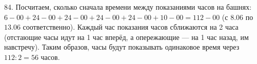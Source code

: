 84. Посчитаем, сколько сначала времени между показаниями часов на башнях: $6-00+24-00+24-00+24-00+24-00+10-00=112-00$ (с $8.06$ по $13.06$ соответственно). Каждый час показания часов сближаются на 2 часа (отстающие часы идут на 1 час вперёд, а опережающие --- на 1 час назад, им навстречу). Таким образов, часы будут показывать одинаковое время через $112:2=56$ часов.\\
